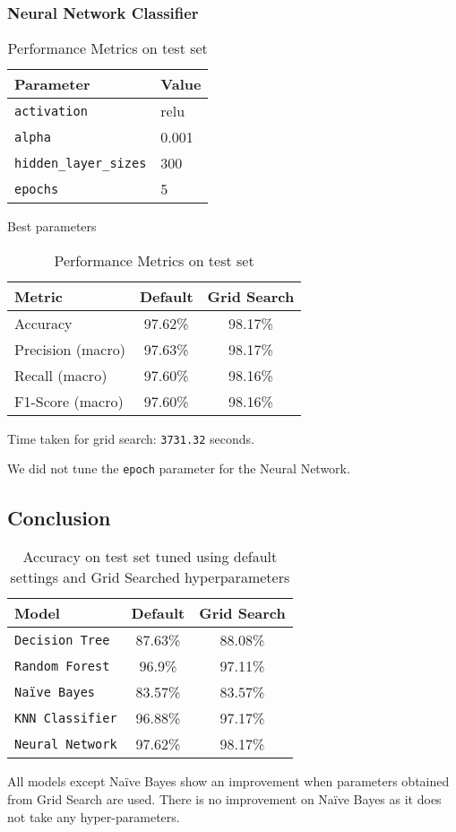 \subsubsection{Neural Network Classifier}
\begin{table}[h!]
  \begin{minipage}{.5\linewidth}
    \centering
    \begin{tabular}{|l|l|}
      \hline
      \textbf{Parameter} & \textbf{Value} \\
      \hline
      \texttt{activation} & relu \\
      \texttt{alpha} & 0.001 \\
      \texttt{hidden\_layer\_sizes} & 300 \\
      \texttt{epochs} & 5 \\
      \hline
    \end{tabular}
    \caption{Best parameters}
  \end{minipage}%
  \begin{minipage}{.5\linewidth}
    \centering
    \begin{tabular}{|l|c|c|}
      \hline
      \textbf{Metric} & \textbf{Default} & \textbf{Grid Search} \\
      \hline
      Accuracy & 97.62\% & 98.17\% \\
      Precision (macro) & 97.63\% & 98.17\% \\
      Recall (macro) & 97.60\% & 98.16\% \\
      F1-Score (macro) & 97.60\% & 98.16\% \\
      \hline
    \end{tabular}
    \caption{Performance Metrics on test set}
  \end{minipage}
\end{table}


Time taken for grid search: \texttt{3731.32} seconds.

We did not tune the \verb|epoch| parameter for the Neural Network.

\subsection{Conclusion}


\begin{table}[h!]
\centering
\begin{tabular}{|l|c|c|}
\hline
\textbf{Model}  &\textbf{Default} & \textbf{Grid Search}\\
\hline
\texttt{Decision Tree} & 87.63\% & 88.08\%\\
\texttt{Random Forest} & 96.9\% & 97.11\%\\
\texttt{Na\"{i}ve Bayes} & 83.57\% & 83.57\%\\
\texttt{KNN Classifier} & 96.88\% & 97.17\%\\
\texttt{Neural Network} & 97.62\%&  98.17\%\\


\hline
\end{tabular}
\caption{Accuracy on test set tuned using default settings and Grid Searched hyperparameters}
\end{table}

All models except Na\"{i}ve Bayes show an improvement when parameters obtained from Grid Search are used. There is no improvement on Na\"{i}ve Bayes as it does not take any hyper-parameters.
